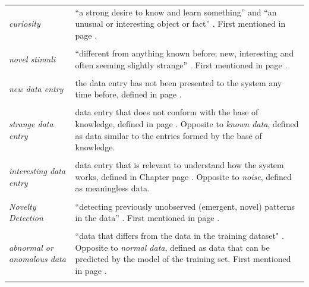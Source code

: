 \documentclass[11pt, oneside]{Thesis} %
\begin{document}
\label{definitions}
\begin{table}[h]
\begin{tabular}{l p{10cm}} %
\emph{curiosity} & “a strong desire to know and learn something” and “an unusual or interesting object or fact” \cite{oxford}. First mentioned in page \pageref{curiosity}. \\ \\
\emph{novel stimuli} & “different from anything known before; new, interesting and often seeming slightly strange” \cite{Pimentel2014}. First mentioned in page \pageref{novel}. \\ \\
\emph{new data entry} & the data entry has not been presented to the system any time before, defined in page \pageref{new}. \\ \\
\emph{strange data entry} &  data entry that does not conform with the base of knowledge, defined in page \pageref{new}. Opposite to \emph{known data}, defined as data similar to the entries formed by the base of knowledge. \\ \\
\emph{interesting data entry} & data entry that is relevant to understand how the system works, defined in Chapter page \pageref{new}. Opposite to \emph{noise}, defined as meaningless data. \\ \\
\emph{Novelty Detection} & “detecting previously unobserved (emergent, novel) patterns in the data” \cite{Chandola2009}. First mentioned in page \pageref{novelty}.\\ \\
\emph{abnormal or anomalous data} & “data that differs from the data in the training dataset" \cite{Pimentel2014}. Opposite to \emph{normal data}, defined as data that can be predicted by the model of the training set. First mentioned in page \pageref{abnormal}.\\ \\

\end{tabular}
\end{table}


\clearpage %

\end{document}
